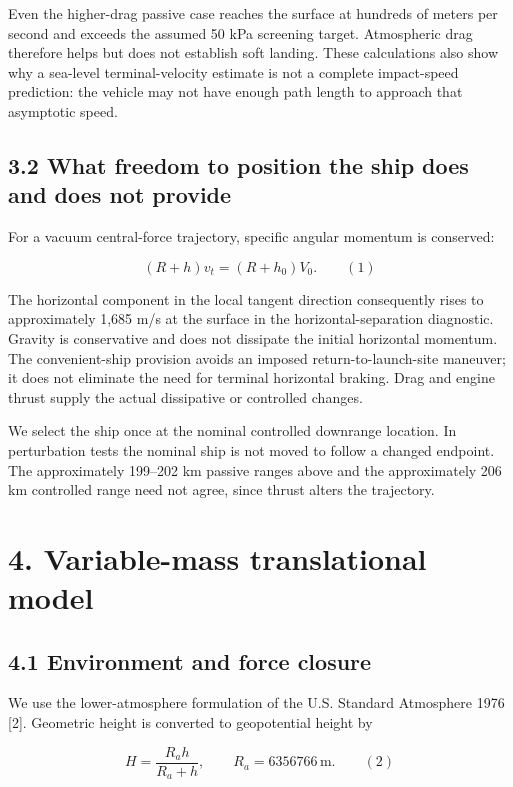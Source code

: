 \documentclass[
  11pt,
  a4paper,
]{article}
\begin{document}
Even the higher-drag passive case reaches the surface at hundreds of
meters per second and exceeds the assumed 50 kPa screening target.
Atmospheric drag therefore helps but does not establish soft landing.
These calculations also show why a sea-level terminal-velocity estimate
is not a complete impact-speed prediction: the vehicle may not have
enough path length to approach that asymptotic speed.

\subsection{3.2 What freedom to position the ship does and does not
provide}\label{what-freedom-to-position-the-ship-does-and-does-not-provide}

For a vacuum central-force trajectory, specific angular momentum is
conserved:

\[ (R+h)v_t=(R+h_0)V_0. \qquad (1) \]

The horizontal component in the local tangent direction consequently
rises to approximately 1,685 m/s at the surface in the
horizontal-separation diagnostic. Gravity is conservative and does not
dissipate the initial horizontal momentum. The convenient-ship provision
avoids an imposed return-to-launch-site maneuver; it does not eliminate
the need for terminal horizontal braking. Drag and engine thrust supply
the actual dissipative or controlled changes.

We select the ship once at the nominal controlled downrange location. In
perturbation tests the nominal ship is not moved to follow a changed
endpoint. The approximately 199--202 km passive ranges above and the
approximately 206 km controlled range need not agree, since thrust
alters the trajectory.

\section{4. Variable-mass translational
model}\label{variable-mass-translational-model}

\subsection{4.1 Environment and force
closure}\label{environment-and-force-closure}

We use the lower-atmosphere formulation of the U.S. Standard Atmosphere
1976 {[}2{]}. Geometric height is converted to geopotential height by

\[ H=\frac{R_a h}{R_a+h},\qquad R_a=6356766\,\mathrm{m}. \qquad (2) \]
\end{document}
